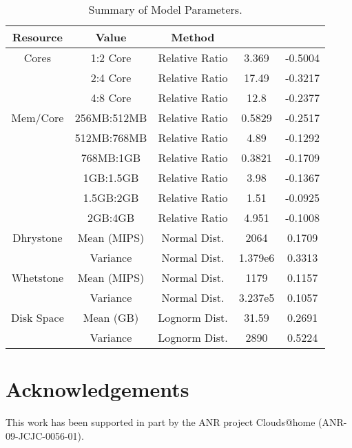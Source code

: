 \documentclass[conference]{IEEEtran}
\begin{document}
\begin{table}
\caption{Summary of Model Parameters.}
\scriptsize
\centering
\begin{tabular}{|c|c|c|c|c|}
\hline
Resource & Value & Method &  &  \\
\hline
Cores & 1:2 Core & Relative Ratio & 3.369 & -0.5004 \\
\hline
& 2:4 Core & Relative Ratio & 17.49 & -0.3217 \\
\hline
& 4:8 Core & Relative Ratio & 12.8 & -0.2377 \\
\hline
Mem/Core & 256MB:512MB & Relative Ratio & 0.5829 & -0.2517 \\
\hline
& 512MB:768MB & Relative Ratio & 4.89 & -0.1292 \\
\hline
& 768MB:1GB & Relative Ratio & 0.3821 & -0.1709 \\
\hline
& 1GB:1.5GB & Relative Ratio & 3.98 & -0.1367 \\
\hline
& 1.5GB:2GB & Relative Ratio & 1.51 & -0.0925 \\
\hline
& 2GB:4GB & Relative Ratio & 4.951 & -0.1008 \\
\hline
Dhrystone & Mean (MIPS) & Normal Dist. & 2064 & 0.1709 \\
\hline
& Variance & Normal Dist. & 1.379e6 & 0.3313 \\
\hline
Whetstone & Mean (MIPS) & Normal Dist. & 1179 & 0.1157 \\
\hline
& Variance & Normal Dist. & 3.237e5 & 0.1057 \\
\hline
Disk Space & Mean (GB) & Lognorm Dist. & 31.59 & 0.2691 \\
\hline
& Variance & Lognorm Dist. & 2890 & 0.5224 \\
\hline
\end{tabular}
\label{model-summary-table}
\end{table}



\section*{Acknowledgements}
\label{Ack}
This work has been supported in part by the ANR project
Clouds@home (ANR-09-JCJC-0056-01).



\end{document}
